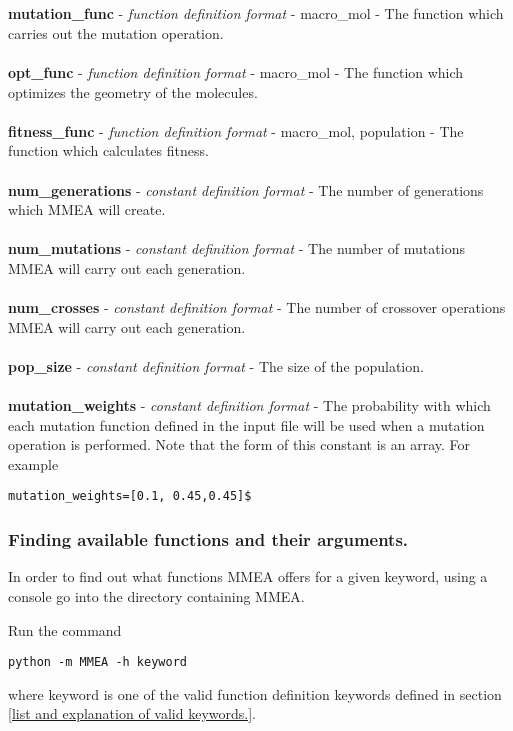 \documentclass{article}
\begin{document}
\\
\\
\textbf{mutation\_func} - \textit{function definition format} - macro\_mol - The function which carries out the mutation operation.
\\
\\
\textbf{opt\_func} - \textit{function definition format} - macro\_mol - The function which optimizes the geometry of the molecules.
\\
\\
\textbf{fitness\_func} - \textit{function definition format} - macro\_mol, population - The function which calculates fitness.
\\
\\
\textbf{num\_generations} - \textit{constant definition format} - The number of generations which MMEA will create.
\\
\\
\textbf{num\_mutations} - \textit{constant definition format} - The number of mutations MMEA will carry out each generation.
\\
\\
\textbf{num\_crosses} - \textit{constant definition format} - The number of crossover operations MMEA will carry out each generation.
\\
\\
\textbf{pop\_size} - \textit{constant definition format} - The size of the population.
\\
\\
\textbf{mutation\_weights} - \textit{constant definition format} - The probability with which each mutation function defined in the input file will be used when a mutation operation is performed. Note that the form of this constant is an array. For example
\begin{verbatim}
mutation_weights=[0.1, 0.45,0.45]$
\end{verbatim}

\subsubsection{Finding available functions and their arguments.}
In order to find out what functions MMEA offers for a given keyword, using a console go into the directory containing MMEA. 

Run the command 
\begin{verbatim}
python -m MMEA -h keyword
\end{verbatim}
where keyword is one of the valid function definition keywords defined in section \ref{list and explanation of valid keywords.}.
\end{document}
